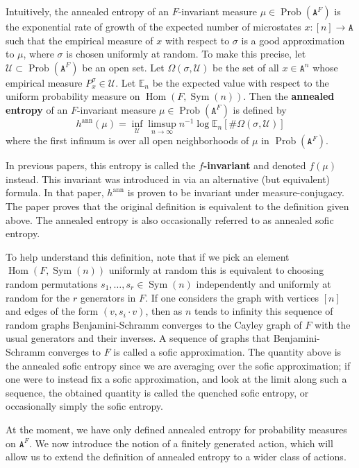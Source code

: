 \documentclass[11pt]{amsart}
\theoremstyle{definition}
\theoremstyle{remark}
\newcommand{\s}{\sigma}
\newcommand{\EE}{\mathbb{E}}
\newcommand{\cU}{\mathcal{U}}
\newcommand{\ann}{\operatorname{ann}}
\newcommand{\Hom}{\operatorname{Hom}}
\newcommand{\Sym}{\operatorname{Sym}}
\newcommand{\sym}{\operatorname{Sym}}
\newcommand{\Prob}{\operatorname{Prob}}
\begin{document}
Intuitively, the annealed entropy of an $F$-invariant measure $\mu \in \Prob(\mathtt{A}^F)$ is the  exponential rate of growth of the expected number of microstates $x:[n]\to \mathtt{A}$ such that the empirical measure of $x$ with respect to $\s$ is a good approximation to $\mu$, where $\s$ is chosen uniformly at random. To make this precise, let $\cU \subset \Prob(\mathtt{A}^F)$ be an open set. Let $\Omega(\sigma,\cU)$ be the set of all $x\in \mathtt{A}^n$ whose empirical measure $P^\s_x \in \cU$. Let $\EE_n$ be the expected value with respect to the uniform probability measure on  $\Hom(F,\sym(n))$. Then the \textbf{annealed entropy} of an $F$-invariant measure $\mu \in \Prob(\mathtt{A}^F)$ is defined by
$$h^{\ann}(\mu) = \inf_{\cU} \limsup_{n\to\infty} n^{-1}\log \EE_n[\#\Omega(\sigma,\cU)]$$
where the first infimum is over all open neighborhoods of $\mu$ in $\Prob(\mathtt{A}^F)$.



In previous papers, this entropy is called the \textbf{$f$-invariant} and denoted $f(\mu)$ instead. This invariant was introduced in \cite{MR2630067} via an alternative (but equivalent) formula. In that paper, $h^{\ann}$ is proven to be invariant under measure-conjugacy. The paper \cite{MR2653969} proves that the original definition is equivalent to the definition given above.  The annealed entropy is also occasionally referred to as annealed sofic entropy.


To help understand this definition, note that if we pick an element $\Hom(F,\Sym(n))$ uniformly at random this is equivalent to choosing random permutations $s_1,\ldots,s_r \in \Sym(n)$ independently and uniformly at random for the $r$ generators in $F$.  If one considers the graph with vertices $[n]$ and edges of the form $(v,s_i\cdot v)$, then as $n$ tends to infinity this sequence of random graphs Benjamini-Schramm converges to the Cayley graph of $F$ with the usual generators and their inverses.  A sequence of graphs that Benjamini-Schramm converges to $F$ is called a sofic approximation. The quantity above is the annealed sofic entropy since we are averaging over the sofic approximation; if one were to instead fix a sofic approximation, and look at the limit along such a sequence, the obtained quantity is called the quenched sofic entropy, or occasionally simply the sofic entropy.

At the moment, we have only defined annealed entropy for probability measures on $\mathtt{A}^F$.  We now introduce the notion of a finitely generated action, which will allow us to extend the definition of annealed entropy to a wider class of actions.  
\end{document}
